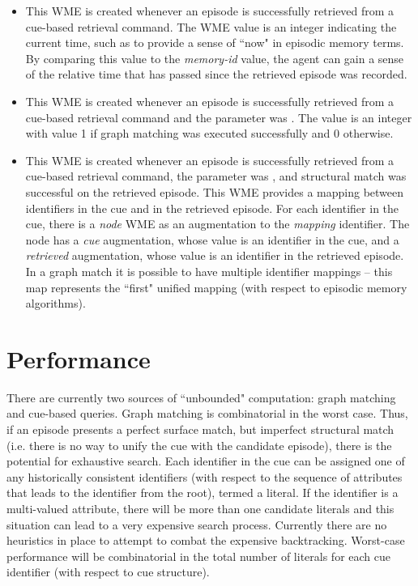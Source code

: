 \begin{itemize}
\item {}

This WME is created whenever an episode is successfully retrieved from a cue-based retrieval command.  
The WME value is an integer indicating the current time, such as to provide a sense of ``now" in episodic memory terms.  
By comparing this value to the \emph{memory-id} value, the agent can gain a sense of the relative time that has passed since the retrieved episode was recorded.

\item {}

This WME is created whenever an episode is successfully retrieved from a cue-based retrieval command and the  parameter was .  
The value is an integer with value 1 if graph matching was executed successfully and 0 otherwise.

\item {}

This WME is created whenever an episode is successfully retrieved from a cue-based retrieval command, the  parameter was , and structural match was successful on the retrieved episode.  
This WME provides a mapping between identifiers in the cue and in the retrieved episode.  
For each identifier in the cue, there is a \emph{node} WME as an augmentation to the \emph{mapping} identifier.  
The node has a \emph{cue} augmentation, whose value is an identifier in the cue, and a \emph{retrieved} augmentation, whose value is an identifier in the retrieved episode.  
In a graph match it is possible to have multiple identifier mappings -- this map represents the ``first" unified mapping (with respect to episodic memory algorithms).

\end{itemize}

\section{Performance}
\label{EPMEM-perf}

There are currently two sources of ``unbounded" computation: graph matching and cue-based queries.  
Graph matching is combinatorial in the worst case.  
Thus, if an episode presents a perfect surface match, but imperfect structural match (i.e. there is no way to unify the cue with the candidate episode), there is the potential for exhaustive search.  
Each identifier in the cue can be assigned one of any historically consistent identifiers (with respect to the sequence of attributes that leads to the identifier from the root), termed a literal.  
If the identifier is a multi-valued attribute, there will be more than one candidate literals and this situation can lead to a very expensive search process.  
Currently there are no heuristics in place to attempt to combat the expensive backtracking.  
Worst-case performance will be combinatorial in the total number of literals for each cue identifier (with respect to cue structure).

